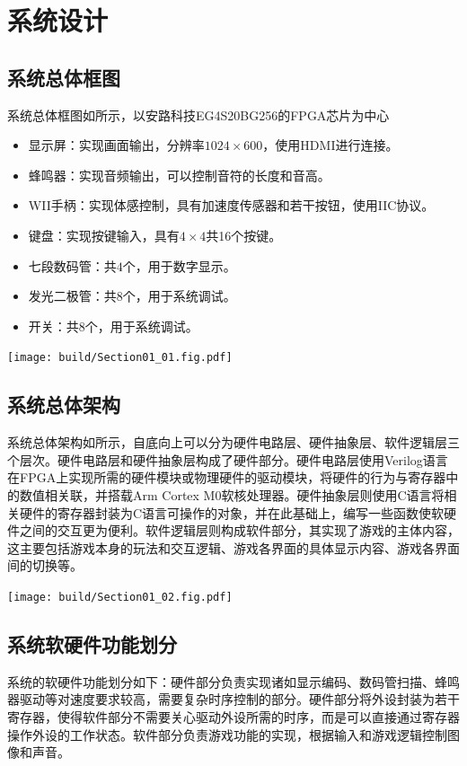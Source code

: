 \section{系统设计}

\subsection{系统总体框图}

系统总体框图如所示，以安路科技EG4S20BG256的FPGA芯片为中心
\begin{itemize}
    \item 显示屏：实现画面输出，分辨率$1024\times 600$，使用HDMI进行连接。
    \item 蜂鸣器：实现音频输出，可以控制音符的长度和音高。
    \item WII手柄：实现体感控制，具有加速度传感器和若干按钮，使用IIC协议。
    \item 键盘：实现按键输入，具有$4\times 4$共16个按键。
    \item 七段数码管：共$4$个，用于数字显示。
    \item 发光二极管：共$8$个，用于系统调试。
    \item 开关：共$8$个，用于系统调试。
\end{itemize}

\begin{Figure}[系统总体框图]
    \texttt{[image: build/Section01\_01.fig.pdf]}
\end{Figure}

\subsection{系统总体架构}
系统总体架构如所示，自底向上可以分为硬件电路层、硬件抽象层、软件逻辑层三个层次。硬件电路层和硬件抽象层构成了硬件部分。硬件电路层使用Verilog语言在FPGA上实现所需的硬件模块或物理硬件的驱动模块，将硬件的行为与寄存器中的数值相关联，并搭载Arm Cortex M0软核处理器。硬件抽象层则使用C语言将相关硬件的寄存器封装为C语言可操作的对象，并在此基础上，编写一些函数使软硬件之间的交互更为便利。软件逻辑层则构成软件部分，其实现了游戏的主体内容，这主要包括游戏本身的玩法和交互逻辑、游戏各界面的具体显示内容、游戏各界面间的切换等。

\begin{Figure}[系统总体架构]
    \texttt{[image: build/Section01\_02.fig.pdf]}
\end{Figure}

\subsection{系统软硬件功能划分}
系统的软硬件功能划分如下：硬件部分负责实现诸如显示编码、数码管扫描、蜂鸣器驱动等对速度要求较高，需要复杂时序控制的部分。硬件部分将外设封装为若干寄存器，使得软件部分不需要关心驱动外设所需的时序，而是可以直接通过寄存器操作外设的工作状态。软件部分负责游戏功能的实现，根据输入和游戏逻辑控制图像和声音。

